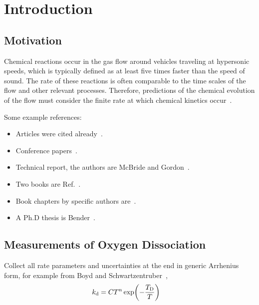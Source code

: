 \graphicspath{{./introduction/}}

\chapter{Introduction}
\label{sec:Introduction}

\section{Motivation}
\label{sec:Motivation}
Chemical reactions occur in the gas flow around vehicles traveling at hypersonic speeds,
   which is typically defined as at least five times faster than the speed of sound.
The rate of these reactions is often comparable to the time scales of the flow and other relevant processes.
Therefore, predictions of the chemical evolution of the flow must consider the finite
   rate at which chemical kinetics occur~\cite{Gnoffo1999,Candler2019}.

Some example references:
\begin{itemize}
\item
Articles were cited already~\cite{Gnoffo1999,Candler2019}.

\item
Conference papers~\cite{ChaudhryGBSC2018}.

\item
Technical report, the authors are McBride and Gordon~\cite{McbrideG1996}.

\item
Two books are Ref.~\cite{RileyHB2006,BoydS2017}.

\item
Book chapters by specific authors are~\cite{TruhlarM1979,Park1996}.

\item
A Ph.D thesis is Bender~\cite{Bender2016}.
\end{itemize}

\section{Measurements of Oxygen Dissociation}
Collect all rate parameters and uncertainties at the end in generic Arrhenius form, for example from Boyd and Schwartzentruber~\cite[p.~130]{BoydS2017},
%
\begin{align}
   k_\mathrm{d} &= C T^{n} \exp( - \frac{T_\mathrm{D}}{T} )
   \label{eqn:Arrhenius}
\end{align}

